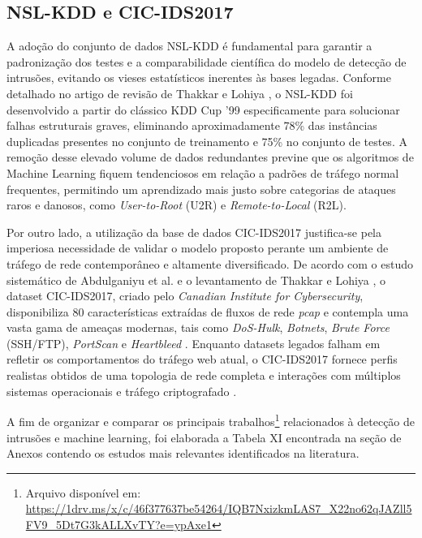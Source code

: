 \documentclass[a4paper,10pt, twocolumn]{article}
\begin{document}
\subsection{NSL-KDD e CIC-IDS2017}
A adoção do conjunto de dados NSL-KDD é fundamental para garantir a padronização dos testes e a comparabilidade científica 
do modelo de detecção de intrusões, evitando os vieses estatísticos inerentes às bases legadas. Conforme detalhado no 
artigo de revisão de Thakkar e Lohiya \cite{Thakkar2021Survey}, o NSL-KDD foi desenvolvido a partir do clássico KDD Cup '99 especificamente para 
solucionar falhas estruturais graves, eliminando aproximadamente 78\% das instâncias duplicadas presentes no conjunto de 
treinamento e 75\% no conjunto de testes. A remoção desse elevado volume de dados redundantes previne que os algoritmos 
de Machine Learning fiquem tendenciosos em relação a padrões de tráfego normal frequentes, permitindo um aprendizado mais 
justo sobre categorias de ataques raros e danosos, como \textit{User-to-Root} (U2R) e \textit{Remote-to-Local} (R2L)\cite{Thakkar2021Survey}.

Por outro lado, a utilização da base de dados CIC-IDS2017 justifica-se pela imperiosa necessidade de validar o modelo proposto 
perante um ambiente de tráfego de rede contemporâneo e altamente diversificado. De acordo com o estudo sistemático de 
Abdulganiyu et al. \cite{Abdulganiyu2023Systematic} e o levantamento de Thakkar e Lohiya \cite{Thakkar2021Survey}, o dataset CIC-IDS2017, criado pelo \textit{Canadian Institute 
for Cybersecurity}, disponibiliza 80 características extraídas de fluxos de rede \textit{pcap} e contempla uma vasta gama de 
ameaças modernas, tais como \textit{DoS-Hulk}, \textit{Botnets}, \textit{Brute Force} (SSH/FTP), \textit{PortScan} e \textit{Heartbleed} \cite{Abdulganiyu2023Systematic} \cite{Thakkar2021Survey}. Enquanto datasets legados 
falham em refletir os comportamentos do tráfego web atual, o CIC-IDS2017 fornece perfis realistas obtidos de uma topologia de rede 
completa e interações com múltiplos sistemas operacionais e tráfego criptografado\cite{Abdulganiyu2023Systematic} \cite{Thakkar2021Survey}. 

A fim de organizar e comparar os principais trabalhos\footnote{Arquivo disponível em: \url{https://1drv.ms/x/c/46f377637be54264/IQB7NxizkmLAS7_X22no62qJAZll5FV9_5Dt7G3kALLXvTY?e=ypAxe1}} relacionados à detecção 
de intrusões e machine learning, foi elaborada a Tabela XI encontrada na seção de Anexos contendo os 
estudos mais relevantes identificados na literatura. 
\end{document}
